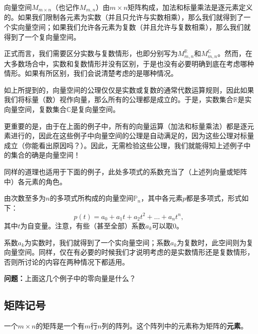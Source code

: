 \begin{example*}
    向量空间$M_{m\times n}$（也记作$M_{m,n}$）由$m\times n$矩阵构成，加法和标量乘法是逐元素定义的。如果我们限制各元素为实数（并且只允许与实数相乘），那么我们就得到了一个实向量空间；如果我们允许各元素为复数（并且允许与复数相乘），那么我们就得到了一个复向量空间。

    正式而言，我们需要区分实数与复数情形，也即分别写为$M_{m, n}^{\mathbb{R}}$和$M_{m, n}^{\mathbb{C}}$。然而，在大多数场合中，实数和复数情形并没有区别，于是也没有必要明确到底在考虑哪种情形。如果有所区别，我们会说清楚考虑的是哪种情况。
\end{example*}

\begin{remark*}
    如上所提到的，向量空间的公理仅仅是实数或复数的通常代数运算规则，因此如果我们将标量（数）视作向量，那么所有的公理都是成立的。于是，实数集合$\mathbb{R}$是实向量空间，复数集合$\mathbb{C}$是复向量空间。

    更重要的是，由于在上面的例子中，所有的向量运算（加法和标量乘法）都是逐元素进行的，因此在这些例子中向量空间的公理是自动满足的，因为这些公理对标量成立（你能看出原因吗？）。因此，无需检验这些公理，我们就能得知上述例子中的集合的确是向量空间！

    同样的道理也适用于下面的例子，此处多项式的系数充当了（上述列向量或矩阵中）各元素的角色。
\end{remark*}

\begin{example*}
    由次数至多为$n$的多项式所构成的向量空间$\mathbb{P}_n$，其中各元素$p$都是多项式，形式如下：\[p(t) = a_0 + a_1t + a_2t^2 + \dots +a_nt^n,\]
    其中$t$为自变量。注意，有些（甚至全部）系数$a_k$可以取$0$。

    系数$a_k$为实数时，我们就得到了一个实向量空间；系数$a_k$为复数时，此空间则为复向量空间。同样，仅在有必要的时候我们才说明考虑的是实数情形还是复数情形，否则所讨论的内容在两种情况下都适用。
\end{example*}

{\bf 问题：}上面这几个例子中的零向量是什么？

\subsection{矩阵记号}\label{subsec:matrix_notation}

一个$m\times n$的矩阵是一个有$m$行$n$列的阵列。这个阵列中的元素称为矩阵的{\bf 元素}。

